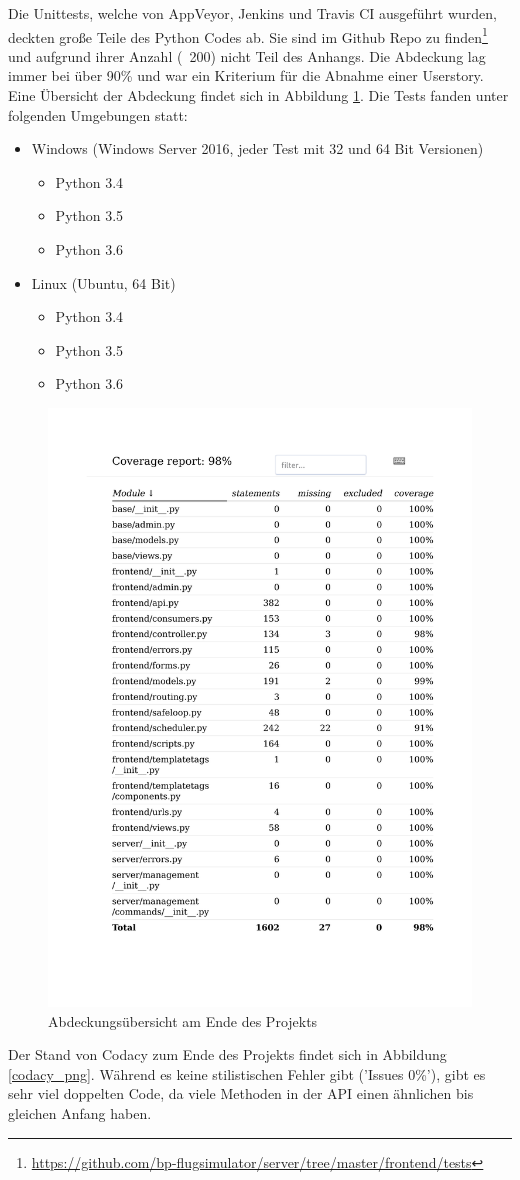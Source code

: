 Die Unittests, welche von AppVeyor, Jenkins und Travis CI ausgeführt wurden, deckten große Teile des Python Codes ab. Sie sind im Github Repo
zu finden\footnote{\url{https://github.com/bp-flugsimulator/server/tree/master/frontend/tests}} und aufgrund ihrer Anzahl (~200) nicht
Teil des Anhangs.
Die Abdeckung lag immer bei über 90\% und war ein Kriterium für die Abnahme einer Userstory. Eine Übersicht der Abdeckung
findet sich in Abbildung \ref{coverage_pdf}.
Die Tests fanden unter folgenden Umgebungen statt:
\begin{itemize}
	\item Windows (Windows Server 2016, jeder Test mit 32 und 64 Bit Versionen)
		\begin{itemize}
			\item Python 3.4
			\item Python 3.5
			\item Python 3.6
		\end{itemize}
	\item Linux (Ubuntu, 64 Bit)
		\begin{itemize}
			\item Python 3.4
			\item Python 3.5
			\item Python 3.6
		\end{itemize}
\end{itemize}
\begin{figure}[t]
	\centering
\includegraphics[width=.8\textwidth]{img/coverage.pdf}
	\caption{Abdeckungsübersicht am Ende des Projekts}
	\label{coverage_pdf}
\end{figure}
Der Stand von Codacy zum Ende des Projekts findet sich in Abbildung \ref{codacy_png}. Während
es keine stilistischen Fehler gibt ('Issues 0\%'), gibt es sehr viel doppelten Code, da viele Methoden
in der API einen ähnlichen bis gleichen Anfang haben.

